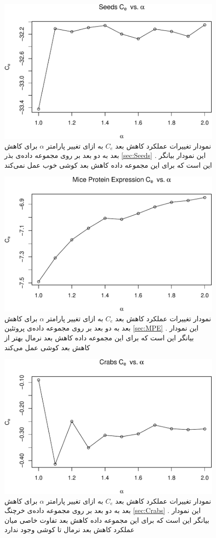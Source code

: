 \begin{figure}[H]
\centering
\includegraphics[width=0.7\linewidth]{Report_files/figure-latex/unnamed-chunk-20-5}
\caption{
نمودار تغییرات عملکرد کاهش بعد 
$C_e$
به ازای تغییر پارامتر
$\alpha$
برای کاهش بعد به 
دو
 بعد بر روی مجموعه داده‌‌‌ی 
بذر
\ref{sec:Seeds}
. این نمودار بیانگر این است که برای این مجموعه داده کاهش بعد 
کوشی خوب
عمل نمی‌کند
}
\end{figure}

\begin{figure}[H]
\centering
\includegraphics[width=0.7\linewidth]{Report_files/figure-latex/unnamed-chunk-20-6}
\caption{
نمودار تغییرات عملکرد کاهش بعد 
$C_e$
به ازای تغییر پارامتر
$\alpha$
برای کاهش بعد به 
دو
 بعد بر روی مجموعه داده‌‌‌ی 
پروتئین
\ref{sec:MPE}
. این نمودار بیانگر این است که برای این مجموعه داده کاهش بعد 
نرمال
بهتر از کاهش بعد 
کوشی 
عمل می‌کند
}
\end{figure}

\begin{figure}[H]
\centering
\includegraphics[width=0.7\linewidth]{Report_files/figure-latex/unnamed-chunk-20-7}
\caption{
نمودار تغییرات عملکرد کاهش بعد 
$C_e$
به ازای تغییر پارامتر
$\alpha$
برای کاهش بعد به 
دو
بعد بر روی مجموعه داده‌‌‌ی 
خرچنگ
\ref{sec:Crabs}
. این نمودار بیانگر این است که برای این مجموعه داده کاهش بعد 
تفاوت خاصی میان عملکرد کاهش بعد نرمال تا کوشی وجود ندارد
}
\end{figure}




